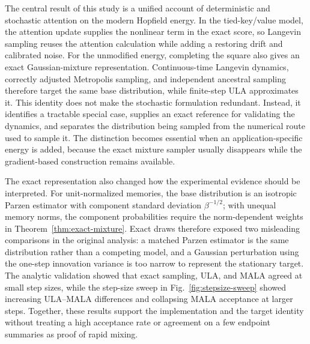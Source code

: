 
The central result of this study is a unified account of deterministic and
stochastic attention on the modern Hopfield energy. In the tied-key/value
model, the attention update supplies the nonlinear term in the exact score, so
Langevin sampling reuses the attention calculation while adding a restoring
drift and calibrated noise. For the unmodified energy, completing the square
also gives an exact Gaussian-mixture representation. Continuous-time Langevin
dynamics, correctly adjusted Metropolis sampling, and independent ancestral
sampling therefore target the same base distribution, while finite-step ULA
approximates it. This identity does not make the stochastic formulation
redundant. Instead, it identifies a tractable special case, supplies an exact
reference for validating the dynamics, and separates the distribution being
sampled from the numerical route used to sample it. The distinction becomes
essential when an application-specific energy is added, because the exact
mixture sampler usually disappears while the gradient-based construction
remains available.

The exact representation also changed how the experimental evidence should be
interpreted. For unit-normalized memories, the base distribution is an
isotropic Parzen estimator with component standard deviation
$\beta^{-1/2}$; with unequal memory norms, the component probabilities require
the norm-dependent weights in Theorem~\ref{thm:exact-mixture}. Exact draws
therefore exposed two misleading comparisons in the original analysis: a
matched Parzen estimator is the same distribution rather than a competing
model, and a Gaussian perturbation using the one-step innovation variance is
too narrow to represent the stationary target. The analytic validation showed
that exact sampling, ULA, and MALA agreed at small step sizes, while the
step-size sweep in Fig.~\ref{fig:stepsize-sweep} showed increasing ULA--MALA
differences and collapsing MALA acceptance at larger steps. Together, these
results support the implementation and the target identity without treating a
high acceptance rate or agreement on a few endpoint summaries as proof of
rapid mixing.

